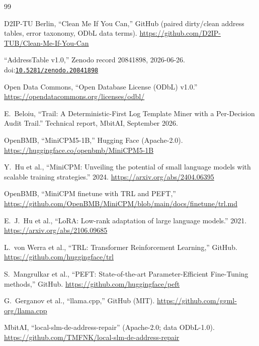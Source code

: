 \documentclass[11pt]{article}
\newcommand{\doiref}[1]{\href{https://doi.org/#1}{\texttt{#1}}}
\begin{document}
\clearpage
\begin{thebibliography}{99}
\small
\raggedright
\setlength{\itemsep}{1.55ex plus 0.4ex}
\setlength{\parsep}{0pt}
\setlength{\parskip}{0pt}
\sloppy
{} D2IP-TU Berlin, ``Clean Me If You Can,'' GitHub
(paired dirty/clean address tables, error taxonomy, ODbL data terms).
\url{https://github.com/D2IP-TUB/Clean-Me-If-You-Can}

 ``AddressTable v1.0,'' Zenodo record 20841898,
2026-06-26. doi:\doiref{10.5281/zenodo.20841898}

 Open Data Commons, ``Open Database License
(ODbL) v1.0.''
\url{https://opendatacommons.org/licenses/odbl/}

 E.~Beloiu, ``Trail: A Deterministic-First Log Template
Miner with a Per-Decision Audit Trail.'' Technical report, MbitAI,
September 2026.

 OpenBMB, ``MiniCPM5-1B,'' Hugging Face
(Apache-2.0).
\url{https://huggingface.co/openbmb/MiniCPM5-1B}

 Y.~Hu et al., ``MiniCPM: Unveiling the
potential of small language models with scalable training
strategies.'' 2024. \url{https://arxiv.org/abs/2404.06395}

 OpenBMB, ``MiniCPM finetune with TRL and PEFT,''
\url{https://github.com/OpenBMB/MiniCPM/blob/main/docs/finetune/trl.md}

 E.~J.~Hu et al., ``LoRA: Low-rank adaptation of large
language models.'' 2021. \url{https://arxiv.org/abs/2106.09685}

 L.~von Werra et al., ``TRL: Transformer Reinforcement
Learning,'' GitHub. \url{https://github.com/huggingface/trl}

 S.~Mangrulkar et al., ``PEFT: State-of-the-art
Parameter-Efficient Fine-Tuning methods,'' GitHub.
\url{https://github.com/huggingface/peft}

 G.~Gerganov et al., ``llama.cpp,'' GitHub (MIT).
\url{https://github.com/ggml-org/llama.cpp}

 MbitAI, ``local-slm-de-address-repair'' (Apache-2.0;
data ODbL-1.0).
\url{https://github.com/TMFNK/local-slm-de-address-repair}

\end{thebibliography}
\end{document}
